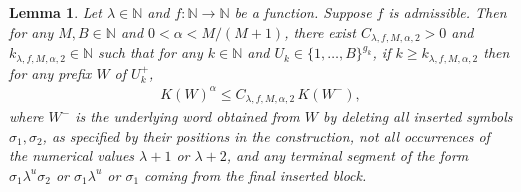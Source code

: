 \documentclass[10pt,a4paper]{amsart}
\newtheorem{lemma}{Lemma}
\begin{document}
\begin{lemma}
\label{lem:stage-prefix-comparison}
Let $\lambda\in\mathbb{N}$ and $f:\mathbb{N}\to\mathbb{N}$ be a function. Suppose $f$ is admissible. Then for any $M,B\in\mathbb{N}$ and $0<\alpha<M/(M+1)$, there exist $C_{\lambda,f,M,\alpha,2}>0$ and $k_{\lambda,f,M,\alpha,2}\in\mathbb N$ such that for any $k\in\mathbb{N}$ and $U_k\in\{1,\ldots,B\}^{g_k}$, if $k\geq k_{\lambda,f,M,\alpha,2}$ then for any prefix $W$ of $U^+_k$,
\begin{align*}
    K(W)^\alpha\leq C_{\lambda,f,M,\alpha,2}\,K(W^-),
\end{align*}
where $W^-$ is the underlying word obtained from $W$ by deleting all inserted symbols $\sigma_1,\sigma_2$, as specified by their positions in the construction, not all occurrences of the numerical values $\lambda+1$ or $\lambda+2$, and any terminal segment of the form $\sigma_1\lambda^u \sigma_2$ or $\sigma_1\lambda^u$ or $\sigma_1$ coming from the final inserted block.
\end{lemma}
\end{document}
